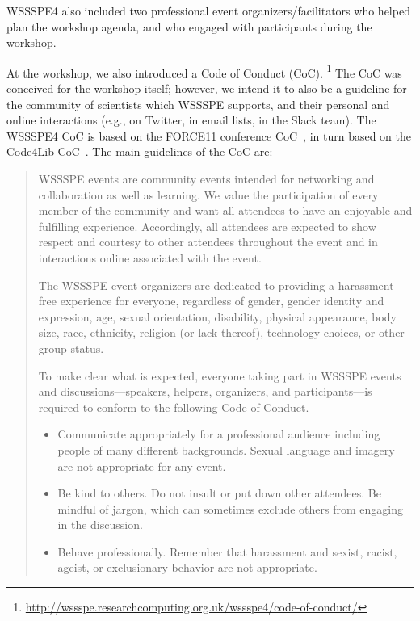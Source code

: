 \documentclass[11pt, oneside]{amsart}
\begin{document}
WSSSPE4 also included two professional event organizers/facilitators who helped
plan the workshop agenda,
and who engaged with participants during the workshop.

At the workshop, we also introduced a Code of Conduct (CoC).%
\footnote{\url{http://wssspe.researchcomputing.org.uk/wssspe4/code-of-conduct/}}
The CoC was conceived for the workshop itself; however, we intend it
to also be a guideline for the community of scientists which WSSSPE
supports, and their personal and online interactions (e.g., on
Twitter, in email lists, in the Slack team). The WSSSPE4 CoC is based on the
FORCE11 conference CoC~\cite{FORCE11:CoC}, in turn based on the Code4Lib
CoC~\cite{Code4Lib:CoC}.
The main guidelines of the CoC are:
\begin{quote}
    WSSSPE events are community events intended for networking and collaboration
    as well as learning. We value the participation of every member of the
    community and want all attendees to have an enjoyable and fulfilling
    experience. Accordingly, all attendees are expected to show respect and
    courtesy to other attendees throughout the event and in interactions online
    associated with the event.

    The WSSSPE event organizers are dedicated to providing a harassment-free
    experience for everyone, regardless of gender, gender identity and
    expression, age, sexual orientation, disability, physical appearance,
    body size, race, ethnicity, religion (or lack thereof), technology choices,
    or other group status.

    To make clear what is expected, everyone taking part in WSSSPE events and
    discussions---speakers, helpers, organizers, and participants---is required
    to conform to the following Code of Conduct.

    \begin{itemize}
    \item Communicate appropriately for a professional audience including
    people of many different backgrounds. Sexual language and imagery are not
    appropriate for any event.

    \item Be kind to others. Do not insult or put down other attendees. Be
    mindful of jargon, which can sometimes exclude others from engaging in the
    discussion.

    \item Behave professionally. Remember that harassment and sexist, racist,
    ageist, or exclusionary behavior are not appropriate.
    \end{itemize}
\end{quote}
\end{document}
